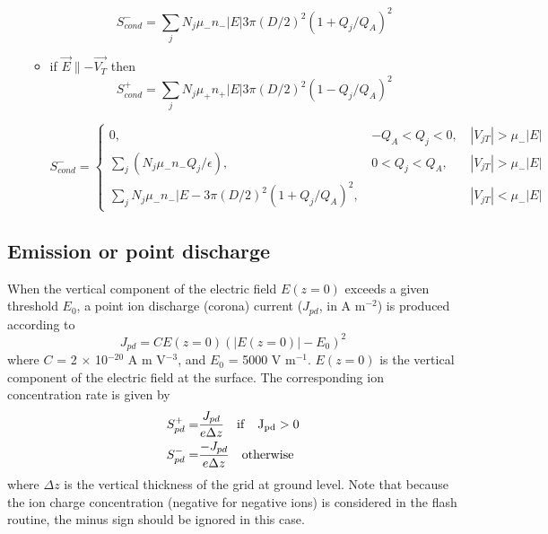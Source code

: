 \begin{enumerate}
\begin{itemize}
          \begin{displaymath}
            S_{cond}^{-} = \sum_j N_j \mu_{-} n_{-} |E| 3 \pi (D/2)^2 (1+Q_j/Q_A)^2
          \end{displaymath}

      \item if $\overrightarrow{E} \parallel - \overrightarrow{V_T}$ then
        \begin{displaymath}
          S_{cond}^{+} = \sum_j N_j \mu_{+} n_{+} |E| 3 \pi (D/2)^2 (1-Q_j/Q_A)^2
        \end{displaymath}

        \begin{displaymath}
          S_{cond}^{-} = \left\{ 
	 \begin{array}{lll}
                      0 \mbox{, }                                           &  -Q_A < Q_j < 0 \mbox{, } & |V_{jT}| > \mu_{-}|E| \\
                      \sum_{j} (N_j \mu_{-} n_{-} Q_j / \epsilon) \mbox{, } &  0 < Q_j < Q_A  \mbox{, } & |V_{jT}| > \mu_{-}|E| \\
                      \sum_{j} N_j \mu_{-} n_{-} |E- 3 \pi (D/2)^2 (1+Q_j/Q_A)^2 \mbox{, } &    & |V_{jT}| < \mu_{-}|E| 
         \end{array}   \right.
         \end{displaymath}
    \end{itemize}
\end{enumerate}

\subsection{Emission or point discharge}

When the vertical component of the electric field $E(z=0)$ exceeds a given threshold $E_0$, a point ion discharge (corona) current ($J_{pd}$, in A m$^{-2}$) is produced according to
\begin{displaymath}
  J_{pd} = C E(z=0) (|E(z=0)| - E_0)^2
\end{displaymath}
where $C$ = 2 $\times$ 10$^{-20}$ A m V$^{-3}$, and $E_0$ = 5000 V m$^{-1}$. $E(z=0)$ is the vertical component of the electric field at the surface.
The corresponding ion concentration rate is given by
\begin{align}
  S_{pd}^{+} =& \frac{J_{pd}}{e \Delta z} \quad  \rm{ if } \quad J_{pd} > 0 \\
  S_{pd}^{-} =& \frac{-J_{pd}}{e \Delta z} \quad \rm{ otherwise}
\end{align}
where $\Delta z$ is the vertical thickness of the grid at ground level.
Note that because the ion charge concentration (negative for negative ions) is considered in the flash routine, the minus sign should be ignored in this case.


